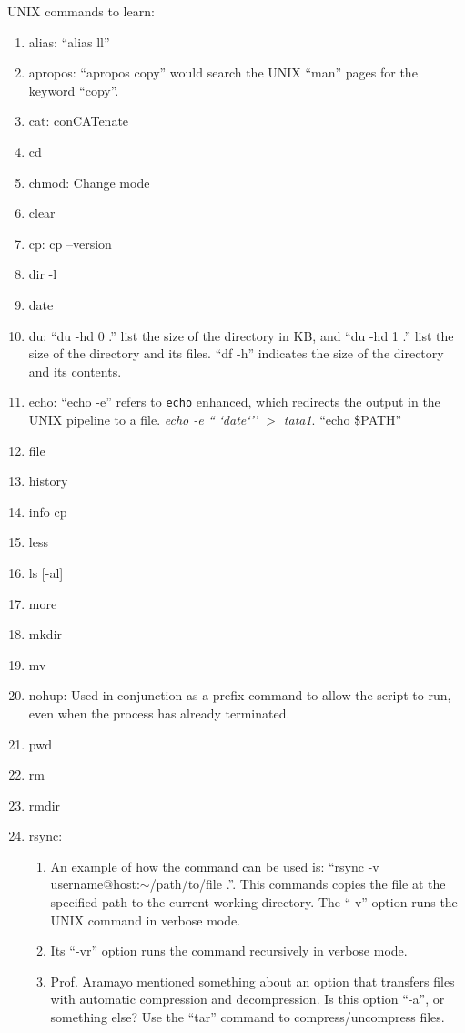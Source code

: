UNIX commands to learn: \vspace{-0.3cm}
\begin{enumerate}	\itemsep -4pt
\item alias: ``alias ll''
\item apropos: ``apropos copy'' would search the UNIX ``man'' pages for the keyword ``copy''.
\item cat: conCATenate
\item cd
\item chmod: Change mode
\item clear
\item cp: cp --version
\item dir -l
\item date
\item du: ``du -hd 0 .'' list the size of the directory in KB, and ``du -hd 1 .'' list the size of the directory and its files. ``df -h'' indicates the size of the directory and its contents. 
\item echo: ``echo -e'' refers to {\tt echo} enhanced, which redirects the output in the UNIX pipeline to a file. {\it echo -e `` `date`'' $>$ tata1}. ``echo \$PATH''
\item file
\item history
\item info cp
\item less
\item ls [-al]
\item more
\item mkdir
\item mv
\item nohup: Used in conjunction as a prefix command to allow the script to run, even when the process has already terminated.
\item pwd
\item rm
\item rmdir
\item rsync: \vspace{-0.3cm}
	\begin{enumerate} \itemsep -2pt
	\item An example of how the command can be used is: ``rsync -v username@host:$\sim$/path/to/file .''. This commands copies the file at the specified path to the current working directory. The ``-v'' option runs the UNIX command in verbose mode.
	\item Its ``-vr'' option runs the command recursively in verbose mode.
	\item Prof. Aramayo mentioned something about an option that transfers files with automatic compression and decompression. Is this option ``-a'', or something else? Use the ``tar'' command to compress/uncompress files.

\end{enumerate}
\end{enumerate}
